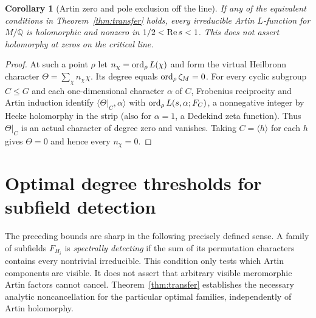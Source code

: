 \documentclass[11pt]{article}
\newtheorem{corollary}[theorem]{Corollary}
\theoremstyle{remark}\newtheorem{remark}[theorem]{Remark}
\newcommand{\Q}{\mathbb Q}\newcommand{\C}{\mathbb C}\newcommand{\F}{\mathbb F}\newcommand{\one}{\mathbf 1}\newcommand{\St}{\mathrm{St}}\newcommand{\Gg}{\Gamma}\newcommand{\PT}{\mathcal P}\newcommand{\eps}{\varepsilon}
\begin{document}
\begin{corollary}[Artin zero and pole exclusion off the line]\label{cor:artin}
If any of the equivalent conditions in Theorem~\ref{thm:transfer} holds, every irreducible Artin $L$-function for $M/\Q$ is holomorphic and nonzero in $1/2<\operatorname{Re} s<1$. This does not assert holomorphy at zeros on the critical line.
\end{corollary}
\begin{proof}
At such a point $\rho$ let $n_\chi=\operatorname{ord}_\rho L(\chi)$ and form the virtual Heilbronn character $\Theta=\sum_{\chi}n_\chi\chi$. Its degree equals $\operatorname{ord}_\rho\zeta_M=0$. For every cyclic subgroup $C\le G$ and each one-dimensional character $\alpha$ of $C$, Frobenius reciprocity and Artin induction identify $\langle\Theta|_C,\alpha\rangle$ with $\operatorname{ord}_\rho L(s,\alpha;F_C)$, a nonnegative integer by Hecke holomorphy in the strip (also for $\alpha=1$, a Dedekind zeta function). Thus $\Theta|_C$ is an actual character of degree zero and vanishes. Taking $C=\langle h\rangle$ for each $h$ gives $\Theta=0$ and hence every $n_\chi=0$.
\end{proof}

\section{Optimal degree thresholds for subfield detection}
The preceding bounds are sharp in the following precisely defined sense. A family of subfields $F_{H_i}$ is \emph{spectrally detecting} if the sum of its permutation characters contains every nontrivial irreducible. This condition only tests which Artin components are visible. It does not assert that arbitrary visible meromorphic Artin factors cannot cancel. Theorem~\ref{thm:transfer} establishes the necessary analytic noncancellation for the particular optimal families, independently of Artin holomorphy.
\end{document}
